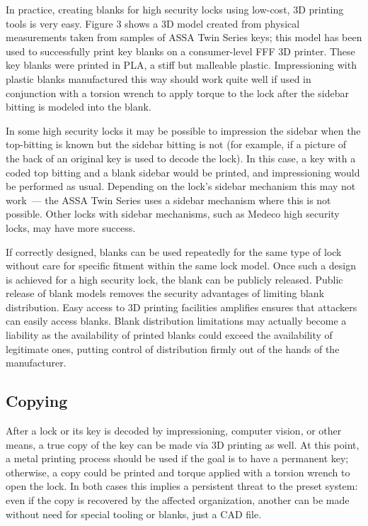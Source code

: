 \documentclass{acm_proc_article-sp}
\begin{document}
In practice, creating blanks for high security locks using low-cost, 3D printing tools is very easy. Figure 3 shows a 3D model created from physical measurements taken from samples of ASSA Twin Series keys; this model has been used to successfully print key blanks on a consumer-level FFF 3D printer. These key blanks were printed in PLA, a stiff but malleable plastic. Impressioning with plastic blanks manufactured this way should work quite well if used in conjunction with a torsion wrench to apply torque to the lock after the sidebar bitting is modeled into the blank.

In some high security locks it may be possible to impression the sidebar when the top-bitting is known but the sidebar bitting is not (for example, if a picture of the back of an original key is used to decode the lock). In this case, a key with a coded top bitting and a blank sidebar would be printed, and impressioning would be performed as usual. Depending on the lock's sidebar mechanism this may not work~--- the ASSA Twin Series uses a sidebar mechanism where this is not possible. Other locks with sidebar mechanisms, such as Medeco high security locks, may have more success.

If correctly designed, blanks can be used repeatedly for the same type of lock without care for specific fitment within the same lock model. Once such a design is achieved for a high security lock, the blank can be publicly released. Public release of blank models removes the security advantages of limiting blank distribution. Easy access to 3D printing facilities amplifies ensures that attackers can easily access blanks. Blank distribution limitations may actually become a liability as the availability of printed blanks could exceed the availability of legitimate ones, putting control of distribution firmly out of the hands of the manufacturer.

\subsection{Copying}
After a lock or its key is decoded by impressioning, computer vision, or other means, a true copy of the key can be made via 3D printing as well. At this point, a metal printing process should be used if the goal is to have a permanent key; otherwise, a copy could be printed and torque applied with a torsion wrench to open the lock. In both cases this implies a persistent threat to the preset system: even if the copy is recovered by the affected organization, another can be made without need for special tooling or blanks, just a CAD file.
\end{document}
